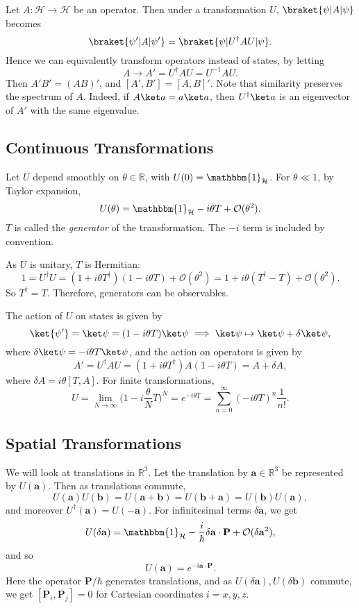 \documentclass[12pt]{article}
\begin{document}
Let $A : \mathcal{H} \to \mathcal{H}$ be an operator. Then under a transformation $U$, $\braket{\psi|A|\psi}$ becomes
\[
	\braket{\psi'|A|\psi'} = \braket{\psi|U^{\dagger}AU|\psi}.
\]
Hence we can equivalently transform operators instead of states, by letting
\[
A \to A' = U^{\dagger} A U = U^{-1} A U.
\]
Then $A'B' = (AB)'$, and $[A',B'] = [A,B]'$. Note that similarity preserves the spectrum of $A$. Indeed, if $A \ket a = a \ket a$, then $U^{\dagger} \ket a$ is an eigenvector of $A'$ with the same eigenvalue.

\subsection{Continuous Transformations}
\label{sub:cont_trans}

Let $U$ depend smoothly on $\theta \in \mathbb{R}$, with $U(0) = \mathbbm{1}_{\mathcal{H}}$. For $\theta \ll 1$, by Taylor expansion,
\[
U(\theta) = \mathbbm{1}_{\mathcal{H}} - i \theta T + \mathcal{O}(\theta^2).
\]
$T$ is called the \emph{generator} of the transformation. The $-i$ term is included by convention.

As $U$ is unitary, $T$ is Hermitian:
\[
1 = U^{\dagger}U = (1+i\theta T^{\dagger})(1 - i\theta T) + \mathcal{O}(\theta^2) = 1 + i \theta(T^{\dagger} - T) + \mathcal{O}(\theta^2).
\]
So $T^{\dagger} = T$. Therefore, generators can be observables.

The action of $U$ on states is given by
\[
	\ket{\psi'} = \ket \psi = (1-i\theta T)\ket\psi \implies \ket \psi \mapsto \ket \psi + \delta \ket \psi,
\]
where $\delta \ket \psi = -i \theta T \ket \psi$, and the action on operators is given by
\[
A' = U^{\dagger}AU = (1+i\theta T^{\dagger})A(1-i\theta T) = A + \delta A,
\]
where $\delta A = i \theta[T, A]$. For finite transformations,
\[
U = \lim_{N \to \infty} \biggl(1 - i \frac{\theta}{N} T \biggr)^{N} = e^{-i \theta T} = \sum_{n = 0}^{\infty} (-i \theta T)^{n} \frac{1}{n!}.
\]


\subsection{Spatial Transformations}
\label{sub:space_trans}

We will look at translations in $\mathbb{R}^3$. Let the translation by $\mathbf{a} \in \mathbb{R}^3$ be represented by $U(\mathbf{a})$. Then as translations commute,
\[
U(\mathbf{a})U(\mathbf{b}) = U(\mathbf{a}+\mathbf{b})=U(\mathbf{b}+\mathbf{a})=U(\mathbf{b})U(\mathbf{a}),
\]
and moreover $U^{\dagger}(\mathbf{a})=U(-\mathbf{a})$. For infinitesimal terms $\delta \mathbf{a}$, we get
\[
U(\delta \mathbf{a}) = \mathbbm{1}_{\mathcal{H}} - \frac{i}{\hbar} \delta \mathbf{a} \cdot \mathbf{P} + \mathcal{O}(\delta \mathbf{a}^2),
\]
and so
\[
U(\mathbf{a}) = e^{-i \mathbf{a} \cdot \mathbf{P}}.
\]
Here the operator $\mathbf{P}/\hbar$ generates translations, and as $U(\delta \mathbf{a}), U(\delta \mathbf{b})$ commute, we get $[\mathbf{P}_i, \mathbf{P}_j] = 0$ for Cartesian coordinates $i = x, y, z$.
\end{document}
